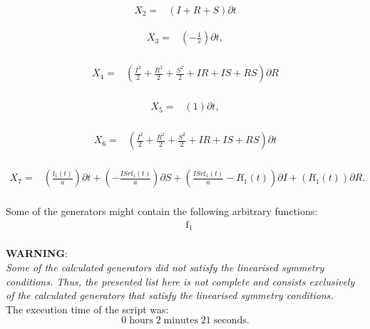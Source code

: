 \begin{align*}
X_{2}=&\left(I+R+S \right)\partial t
\end{align*}

\begin{align*}
X_{3}=&\left(- \frac{1}{r} \right)\partial t,\\
\end{align*}

\begin{align*}
X_{4}=&\left(\frac{I^{2}}{2}+\frac{R^{2}}{2}+\frac{S^{2}}{2}+I R+I S+R S \right)\partial R\\
\end{align*}

\begin{align*}
X_{5}=&\left(1 \right)\partial t,\\
\end{align*}

\begin{align*}
X_{6}=&\left(\frac{I^{2}}{2}+\frac{R^{2}}{2}+\frac{S^{2}}{2}+I R+I S+R S \right)\partial t\\
\end{align*}

\begin{align*}
X_{7}=&\left(\frac{\operatorname{f_{1}}{\left(t \right)}}{a} \right)\partial t+\left(- \frac{I S r \operatorname{f_{1}}{\left(t \right)}}{a} \right)\partial S+\left(\frac{I S r \operatorname{f_{1}}{\left(t \right)}}{a} - I \operatorname{f_{1}}{\left(t \right)} \right)\partial I+\left(I \operatorname{f_{1}}{\left(t \right)} \right)\partial R.\\
\end{align*}



\noindent Some of the generators might contain the following arbitrary functions:
\begin{align*}
&\operatorname{f_{1}}\\
\end{align*}

\noindent\huge\textbf{WARNING}:\\
\noindent\Large\textit{Some of the calculated generators did not satisfy the linearised symmetry conditions. Thus, the presented list here is not complete and consists exclusively of the calculated generators that satisfy the linearised symmetry conditions.}\normalsize\\[2cm]
\noindent The execution time of the script was:
$$0\;\mathrm{hours}\;2\;\mathrm{minutes}\;21 \;\mathrm{seconds}.$$
